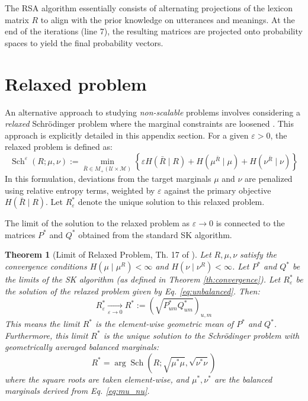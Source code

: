 \documentclass{article}
\newtheorem{theorem}{Theorem}[section] %
\begin{document}
    The RSA algorithm essentially consists of alternating projections of the lexicon matrix $R$ to align with the prior knowledge on utterances and meanings. At the end of the iterations (line 7), the resulting matrices are projected onto probability spaces to yield the final probability vectors.

\section{Relaxed problem}\label{sec:relax}


An alternative approach to studying \textit{non-scalable} problems involves considering a \textit{relaxed} Schrödinger problem where the marginal constraints are loosened \cite{baradat2023convergencesinkhornalgorithmschrodinger}. This approach is explicitly detailed in this appendix section. For a given $\varepsilon > 0$, the relaxed problem is defined as:
\begin{equation}\label{eq:unbalanced}
    \operatorname{Sch}^{\varepsilon}(R ; \mu, \nu):=\min_{\bar{R} \in M_{+}(\mathcal{U} \times \mathcal{M})} \left\{\varepsilon H(\bar{R} \mid R)+H\left(\mu^{\bar{R}} \mid \mu\right)+H\left(\nu^{\bar{R}} \mid \nu\right) \right\}
\end{equation}
In this formulation, deviations from the target marginals $\mu$ and $\nu$ are penalized using relative entropy terms, weighted by $\varepsilon$ against the primary objective $H(\bar{R} \mid R)$. Let $R_\varepsilon^*$ denote the unique solution to this relaxed problem.

The limit of the solution to the relaxed problem as $\varepsilon \to 0$ is connected to the matrices $P^*$ and $Q^*$ obtained from the standard SK algorithm.

\begin{theorem}[Limit of Relaxed Problem, Th. 17 of \cite{baradat2023convergencesinkhornalgorithmschrodinger}]
    Let $R, \mu, \nu$ satisfy the convergence conditions $H(\mu \mid \mu^R)<\infty$ and $H(\nu \mid \nu^R)<\infty$. Let $P^*$ and $Q^*$ be the limits of the SK algorithm (as defined in Theorem \ref{th:convergence}). Let $R_\varepsilon^*$ be the solution of the relaxed problem given by Eq. \ref{eq:unbalanced}. Then:
    \begin{equation}
        R_\varepsilon^* \underset{\varepsilon \to 0}{\longrightarrow} R^* := \left(\sqrt{P^*_{um} Q^*_{um}}\right)_{u,m}
    \end{equation}
    This means the limit $R^*$ is the element-wise geometric mean of $P^*$ and $Q^*$. Furthermore, this limit $R^*$ is the unique solution to the Schrödinger problem with geometrically averaged balanced marginals:
    $$ R^* = \arg \operatorname{Sch}(R ; \sqrt{\mu^* \mu}, \sqrt{\nu^* \nu}) $$
    where the square roots are taken element-wise, and $\mu^*, \nu^*$ are the balanced marginals derived from Eq. \ref{eq:mu_nu}.
\end{theorem}
\end{document}
